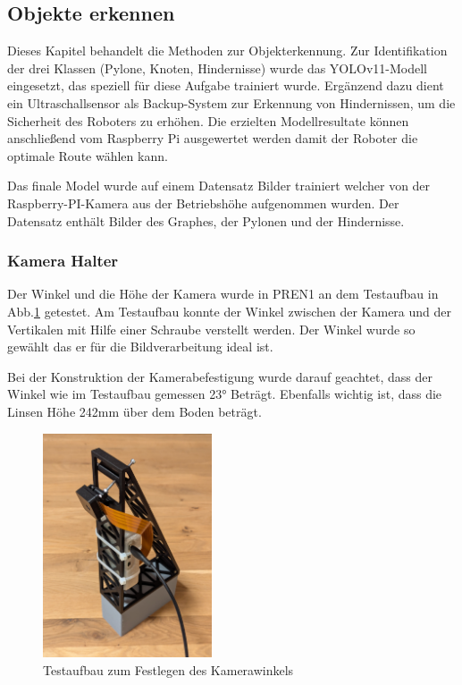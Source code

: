 
\subsection{Objekte erkennen}

Dieses Kapitel behandelt die Methoden zur Objekterkennung. Zur Identifikation der drei Klassen (Pylone, Knoten, Hindernisse) wurde das YOLOv11-Modell eingesetzt, das speziell für diese Aufgabe trainiert wurde. Ergänzend dazu dient ein Ultraschallsensor als Backup-System zur Erkennung von Hindernissen, um die Sicherheit des Roboters zu erhöhen. Die erzielten Modellresultate können anschließend vom Raspberry Pi ausgewertet werden damit der Roboter die optimale Route wählen kann.

Das finale Model wurde auf einem Datensatz Bilder trainiert welcher von der Raspberry-PI-Kamera aus der Betriebshöhe aufgenommen wurden. Der Datensatz enthält Bilder des Graphes, der Pylonen und der Hindernisse. 

\subsubsection{Kamera Halter}
\label{Kamera Halter}
Der Winkel und die Höhe der Kamera wurde in PREN1 an dem Testaufbau in Abb.\ref{fig:Testaufbau zum Festlegen des Kamerawinkels} getestet. Am Testaufbau konnte der Winkel zwischen der Kamera und der Vertikalen mit Hilfe einer Schraube verstellt werden. Der Winkel wurde so gewählt das er für die Bildverarbeitung ideal ist. 

Bei der Konstruktion der Kamerabefestigung wurde darauf geachtet, dass der Winkel wie im Testaufbau gemessen 23° Beträgt. Ebenfalls wichtig ist, dass die Linsen Höhe 242mm  über dem Boden beträgt. 


\begin{figure}[H]
\centering
\includegraphics[width=5cm]{assets/MT/camer_tower_2.png}
\caption{Testaufbau zum Festlegen des Kamerawinkels}
\label{fig:Testaufbau zum Festlegen des Kamerawinkels}
\end{figure}

